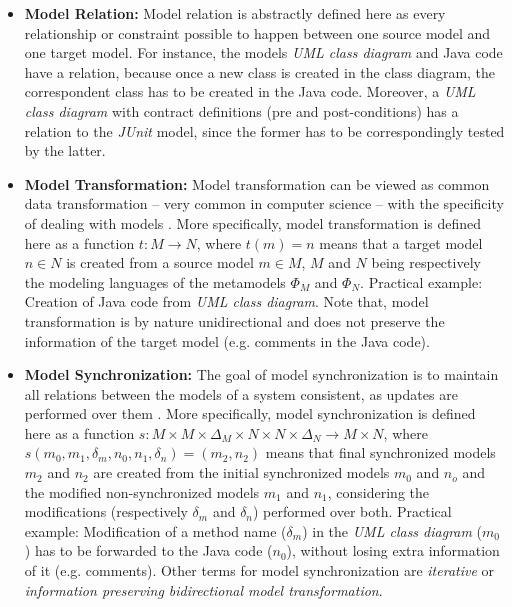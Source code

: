 \documentclass[tuberlin,cic,tc,english,noabntcite,oneside]{iiufrgs}
\begin{document}
\begin{itemize}
	\item \textbf{Model Relation:} Model relation is abstractly defined here as every relationship or constraint possible to happen between one source model and one target model. For instance, the models \emph{UML class diagram} and Java code have a relation, because once a new class is created in the class diagram, the correspondent class has to be created in the Java code. Moreover, a \emph{UML class diagram} with contract definitions (pre and post-conditions) has a relation to the \emph{JUnit} model, since the former has to be correspondingly tested by the latter.

	\item \textbf{Model Transformation:} Model transformation can be viewed as common data transformation – very common in computer science – with the specificity of dealing with models \citep{czarnecki2006feature}. More specifically, model transformation is defined here as a function $t : M \rightarrow N$, where $t(m) = n$ means that a target model $n \in N$ is created from a source model $m \in M$, $M$ and $N$ being respectively the modeling languages of the metamodels $\Phi_M$ and $\Phi_N$. Practical example: Creation of Java code from \emph{UML class diagram}. Note that, model transformation is by nature unidirectional and does not preserve the information of the target model (e.g. comments in the Java code).

	\item \textbf{Model Synchronization:} The goal of model synchronization is to maintain all relations between the models of a system consistent, as updates are performed over them \citep{diskin2011model}. More specifically, model synchronization is defined here as a function $s : M \times M \times \Delta_M \times N \times N \times \Delta_N \rightarrow M \times N $, where $s(m_0,m_1,\delta_m,n_0,n_1,\delta_n) = (m_2,n_2)$ means that final synchronized models $m_2$ and $n_2$ are created from the initial synchronized models $m_0$ and $n_o$ and the modified non-synchronized models $m_1$ and $n_1$, considering the modifications (respectively $\delta_m$ and $\delta_n$) performed over both. Practical example: Modification of a method name ($\delta_m$) in the \emph{UML class diagram} ($m_0$) has to be forwarded to the Java code ($n_0$), without losing extra information of it (e.g. comments). Other terms for model synchronization are \emph{iterative} or \emph{information preserving bidirectional model transformation}.


\end{itemize}
\end{document}
